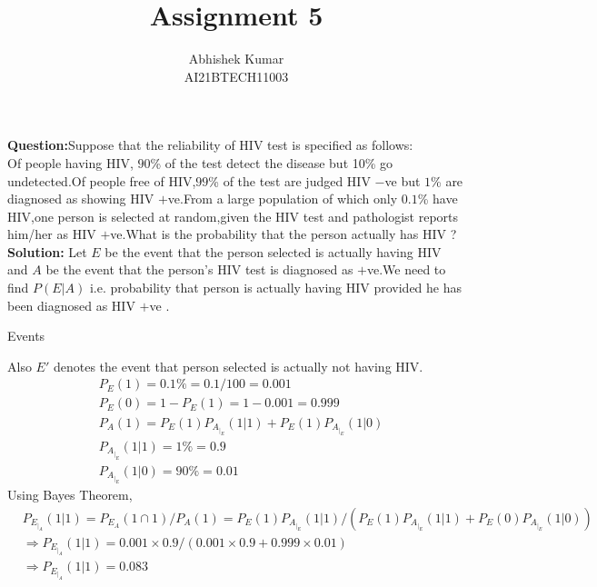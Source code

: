 \documentclass[journal, 8pt, twocolumn]{IEEEtran}
\title{Assignment 5 \\}
\author{Abhishek Kumar\\AI21BTECH11003}
\begin{document}
	\maketitle
	\textbf{Question:}Suppose that the reliability of HIV test is specified as follows:\\
	Of people having HIV, $90$\% of the test detect the disease but 10\% go undetected.Of people free of HIV,$99$\% of the test are judged HIV $-$ve but $1$\% are diagnosed as showing HIV $+$ve.From a large population of which only $0.1$\% have HIV,one person is selected at random,given the HIV test and pathologist reports him/her as HIV $+$ve.What is the probability that the person actually has HIV ?\\
	
	\textbf{Solution:}
	Let $E$ be the event that the person selected is actually having HIV and $A$ be the event that the person's HIV test is diagnosed as $+$ve.We need to find $P(E|A)$ i.e. probability that person is actually having HIV provided he has been diagnosed as HIV $+$ve .
	
	\begin{table}[ht!]
		\centering
		
		\caption{Events}
		\label{Table:1}
	\end{table}
	
	
	Also    $E'$ denotes the event that person selected is actually not having HIV.
	\begin{align}
	&P_E(1)=0.1\%=0.1/100=0.001\\
	&P_E(0)=1-P_E(1)=1-0.001=0.999\\
	&P_A(1)=P_E(1)P_A_|_E(1|1)+P_E(1)P_A_|_E(1|0)\\
	&P_A_|_E(1|1)=1\%=0.9\\
	&P_A_|_E(1|0)=90\%=0.01
	\end{align}
	Using Bayes Theorem,
	\begin{align}
	    &P_E_|_A(1|1)=P_E_A(1 \cap 1)/P_A(1)=P_E(1)P_A_|_E(1|1)/(P_E(1)P_A_|_E(1|1)+P_E(0)P_A_|_E(1|0))\\
	    &\Rightarrow P_E_|_A(1|1)=0.001\times0.9/(0.001\times0.9+0.999\times0.01)\\
	    &\Rightarrow P_E_|_A(1|1)=0.083 
	\end{align}
	
\end{document}
